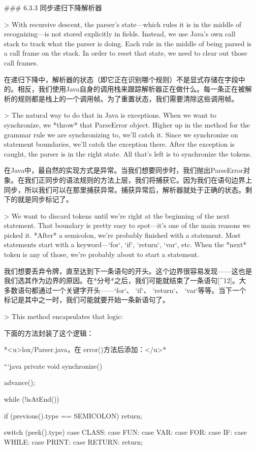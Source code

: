 \documentclass[cn,11pt,chinese]{elegantbook}
\begin{document}
{### 6.3.3 同步递归下降解析器

> With recursive descent, the parser’s state—which rules it is in the middle of recognizing—is not stored explicitly in fields. Instead, we use Java’s own call stack to track what the parser is doing. Each rule in the middle of being parsed is a call frame on the stack. In order to reset that state, we need to clear out those call frames.

在递归下降中，解析器的状态（即它正在识别哪个规则）不是显式存储在字段中的。相反，我们使用Java自身的调用栈来跟踪解析器正在做什么。每一条正在被解析的规则都是栈上的一个调用帧。为了重置状态，我们需要清除这些调用帧。

> The natural way to do that in Java is exceptions. When we want to synchronize, we *throw* that ParseError object. Higher up in the method for the grammar rule we are synchronizing to, we’ll catch it. Since we synchronize on statement boundaries, we’ll catch the exception there. After the exception is caught, the parser is in the right state. All that’s left is to synchronize the tokens.

在Java中，最自然的实现方式是异常。当我们想要同步时，我们抛出ParseError对象。在我们正同步的语法规则的方法上层，我们将捕获它。因为我们在语句边界上同步，所以我们可以在那里捕获异常。捕获异常后，解析器就处于正确的状态。剩下的就是同步标记了。

> We want to discard tokens until we’re right at the beginning of the next statement. That boundary is pretty easy to spot—it’s one of the main reasons we picked it. *After* a semicolon, we’re probably finished with a statement. Most statements start with a keyword—`for`, `if`, `return`, `var`, etc. When the *next* token is any of those, we’re probably about to start a statement.

我们想要丢弃令牌，直至达到下一条语句的开头。这个边界很容易发现——这也是我们选其作为边界的原因。在*分号*之后，我们可能就结束了一条语句[^12]。大多数语句都通过一个关键字开头——`for`、 `if`、 `return`、 `var`等等。当下一个标记是其中之一时，我们可能就要开始一条新语句了。

> This method encapsulates that logic:

下面的方法封装了这个逻辑：

*<u>lox/Parser.java，在 error()方法后添加：</u>*

```java
  private void synchronize() {
    advance();

    while (!isAtEnd()) {
      if (previous().type == SEMICOLON) return;

      switch (peek().type) {
        case CLASS:
        case FUN:
        case VAR:
        case FOR:
        case IF:
        case WHILE:
        case PRINT:
        case RETURN:
          return;
      }

}}}
\end{document}
